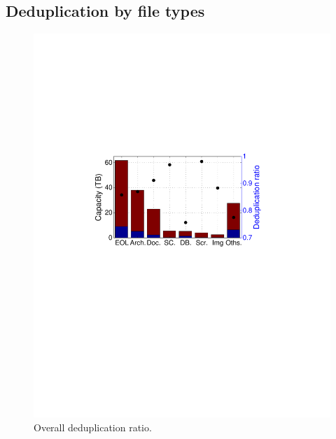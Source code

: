
\subsection{Deduplication by file types}


\begin{figure}[t]
	\centering
	\begin{minipage}{0.22\textwidth}
		\centering
		\includegraphics[width=1\textwidth]{graphs/dedup-overall}
		\caption{Overall deduplication ratio.}
		\label{fig:dedup-overall}
	\end{minipage}
	\begin{minipage}{0.22\textwidth}
		\centering

\end{minipage}
\end{figure}
